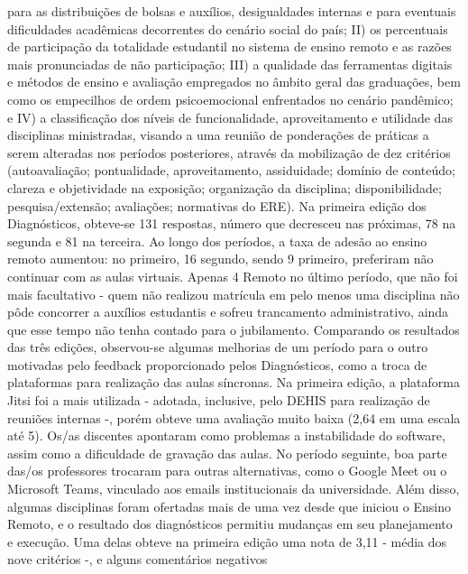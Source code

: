 para as distribuições de bolsas e auxílios, desigualdades internas e para eventuais dificuldades
acadêmicas decorrentes do cenário social do país; II) os percentuais de participação da totalidade
estudantil no sistema de ensino remoto e as razões mais pronunciadas de não participação; III) a
qualidade das ferramentas digitais e métodos de ensino e avaliação empregados no âmbito geral
das graduações, bem como os empecilhos de ordem psicoemocional enfrentados no cenário
pandêmico; e IV) a classificação dos níveis de funcionalidade, aproveitamento e utilidade das
disciplinas ministradas, visando a uma reunião de ponderações de práticas a serem alteradas nos
períodos posteriores, através da mobilização de dez critérios (autoavaliação; pontualidade,
aproveitamento, assiduidade; domínio de conteúdo; clareza e objetividade na exposição;
organização da disciplina; disponibilidade; pesquisa/extensão; avaliações; normativas do ERE).
Na primeira edição dos Diagnósticos, obteve-se 131 respostas, número que decresceu nas
próximas, 78 na segunda e 81 na terceira. Ao longo dos períodos, a taxa de adesão ao ensino
remoto aumentou: no primeiro, 16%
segundo, sendo 9%
primeiro, preferiram não continuar com as aulas virtuais. Apenas 4%
Remoto no último período, que não foi mais facultativo - quem não realizou matrícula em pelo
menos uma disciplina não pôde concorrer a auxílios estudantis e sofreu trancamento
administrativo, ainda que esse tempo não tenha contado para o jubilamento. Comparando os
resultados das três edições, observou-se algumas melhorias de um período para o outro
motivadas pelo feedback proporcionado pelos Diagnósticos, como a troca de plataformas para
realização das aulas síncronas. Na primeira edição, a plataforma Jitsi foi a mais utilizada -
adotada, inclusive, pelo DEHIS para realização de reuniões internas -, porém obteve uma
avaliação muito baixa (2,64 em uma escala até 5). Os/as discentes apontaram como problemas a
instabilidade do software, assim como a dificuldade de gravação das aulas. No período seguinte,
boa parte das/os professores trocaram para outras alternativas, como o Google Meet ou o
Microsoft Teams, vinculado aos emails institucionais da universidade. Além disso, algumas
disciplinas foram ofertadas mais de uma vez desde que iniciou o Ensino Remoto, e o resultado
dos diagnósticos permitiu mudanças em seu planejamento e execução. Uma delas obteve na
primeira edição uma nota de 3,11 - média dos nove critérios -, e alguns comentários negativos
